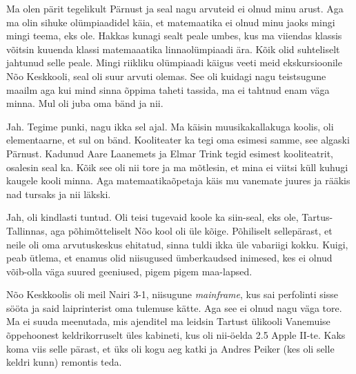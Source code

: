 

Ma olen pärit tegelikult Pärnust ja seal nagu arvuteid ei olnud minu arust. Aga 
ma olin sihuke olümpiaadidel käia, et matemaatika ei olnud minu jaoks mingi 
mingi teema, eks ole. Hakkas kunagi sealt peale umbes, kus ma viiendas klassis 
võitsin kuuenda klassi matemaaatika linnaolümpiaadi ära. Kõik olid suhteliselt 
jahtunud selle peale. Mingi riikliku olümpiaadi käigus veeti meid 
ekskursioonile Nõo Keskkooli, seal oli suur arvuti 
olemas. See oli  kuidagi nagu teistsugune maailm aga kui mind sinna õppima 
taheti tassida, ma ei tahtnud enam väga minna. Mul oli juba oma bänd ja nii.


Jah. Tegime punki, nagu ikka sel ajal. Ma käisin muusikakallakuga koolis, oli 
elementaarne, et sul on bänd. Kooliteater ka tegi oma esimesi samme, see 
algaski Pärnust. Kadunud Aare Laanemets ja Elmar 
Trink tegid  esimest kooliteatrit, osalesin seal ka. 
Kõik see oli nii tore ja ma mõtlesin, et mina ei viitsi küll kuhugi kaugele 
kooli minna. Aga matemaatikaõpetaja käis mu vanemate juures ja rääkis nad 
tursaks ja nii läkski. 


Jah, oli kindlasti tuntud. Oli teisi tugevaid koole ka siin-seal, eks ole, 
Tartus-Tallinnas,  aga põhimõtteliselt Nõo kool oli üle kõige. Põhiliselt 
sellepärast, et neile oli oma arvutuskeskus ehitatud, sinna tuldi ikka üle 
vabariigi kokku. Kuigi, peab ütlema, et enamus olid niisugused ümberkaudsed 
inimesed, kes ei olnud võib-olla väga suured geeniused,  pigem pigem 
maa-lapsed. 

Nõo Keskkoolis oli meil  Nairi 3-1, niisugune 
\emph{mainframe}, kus sai perfolinti sisse sööta ja said laiprinterist oma 
tulemuse kätte. Aga see ei olnud nagu väga tore. Ma ei suuda meenutada, mis 
ajenditel ma leidsin Tartust ülikooli Vanemuise õppehoonest  keldrikorruselt üles kabineti, kus oli 
nii-öelda 2.5 Apple II-te. Kaks koma viis selle pärast, 
et üks oli kogu aeg katki ja Andres Peiker (kes oli 
selle keldri kunn) remontis teda.

